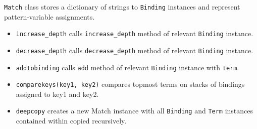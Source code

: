\texttt{Match} class stores a dictionary of strings to \texttt{Binding} instances and represent pattern-variable assignments. 

\begin{itemize}
\item
\texttt{increase\_depth} calls \texttt{increase\_depth} method of relevant \texttt{Binding} instance.

\item
\texttt{decrease\_depth} calls \texttt{decrease\_depth} method of relevant \texttt{Binding} instance.

\item
\texttt{addtobinding} calls \texttt{add} method of relevant \texttt{Binding} instance with \texttt{term}.

\item
\texttt{comparekeys(key1, key2)} compares topmost terms on stacks of bindings assigned to key1 and key2.

\item
	\texttt{deepcopy} creates a new Match instance with all \texttt{Binding} and \texttt{Term} instances contained within copied recursively.
\end{itemize}
